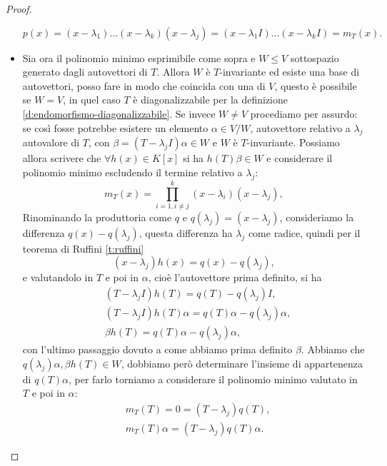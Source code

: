 \begin{proof}
\begin{itemize}
\begin{equation*}
				p(x) = (x-\lambda_1)\dots(x-\lambda_k)(x-\lambda_j) = (x-\lambda_1 I)\dots(x-\lambda_k I) = m_T(x).
			\end{equation*}
		\item Sia ora il polinomio minimo esprimibile come sopra e $W \leq V$ sottospazio generato dagli autovettori di $T$.
			Allora $W$ è $T$-invariante ed esiste una base di autovettori, posso fare in modo che coincida con una di $V$, questo è possibile se $W=V$, in quel caso $T$ è diagonalizzabile per la definizione \ref{d:endomorfismo-diagonalizzabile}.
			Se invece $W\neq V$ procediamo per assurdo: se così fosse potrebbe esistere un elemento $\alpha\in V/W$, autovettore relativo a $\lambda_j$ autovalore di $T$, con $\beta = (T-\lambda_j I)\alpha\in W$ e $W$ è $T$-invariante.
			Possiamo allora scrivere che $\forall h(x)\in K[x]$ si ha $h(T)\beta\in W$ e considerare il polinomio minimo escludendo il termine relativo a $\lambda_j$:
			\begin{equation*}
				m_T(x) = \prod\limits_{i=1 , i\neq j}^k(x-\lambda_i)(x-\lambda_j),
			\end{equation*}
			Rinominando la produttoria come $q$ e $q(\lambda_j) =(x-\lambda_j)$, consideriamo la differenza $q(x)-q(\lambda_j)$, questa differenza ha $\lambda_j$ come radice, quindi per il teorema di Ruffini \ref{t:ruffini}
			\begin{equation*}
				(x-\lambda_j)h(x) = q(x) - q(\lambda_j),
			\end{equation*}
			e valutandolo in $T$ e poi in $\alpha$, cioè l'autovettore prima definito, si ha
			\begin{equation*}
				\begin{aligned}
					&(T-\lambda_j I) h(T) = q(T) -q(\lambda_j)I,\\
					&(T-\lambda_j I) h(T) \alpha = q(T) \alpha -q(\lambda_j) \alpha,\\
					& \beta h(T) =  q(T) \alpha -q(\lambda_j) \alpha,
				\end{aligned}
			\end{equation*}
			con l'ultimo passaggio dovuto a come abbiamo prima definito $\beta$.
			Abbiamo che  $q(\lambda_j) \alpha, \beta h(T)\in W$, dobbiamo però determinare l'insieme di appartenenza di $q(T) \alpha$, per farlo torniamo a considerare il polinomio minimo valutato in $T$ e poi in $\alpha$:
			\begin{equation*}
				\begin{aligned}
					&m_T(T) = 0 = (T-\lambda_j)q(T),\\
					&m_T(T)\alpha =  (T-\lambda_j)q(T)\alpha.

\end{aligned}
\end{equation*}
\end{itemize}
\end{proof}

